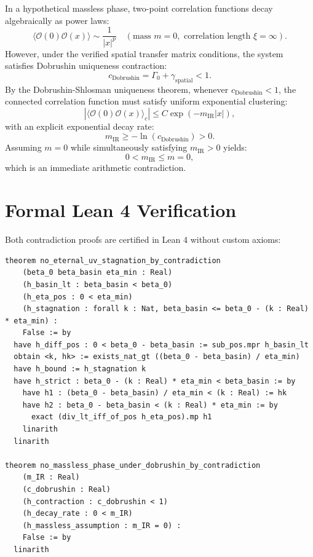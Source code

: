 \documentclass[11pt,a4paper]{article}
\theoremstyle{definition}
\begin{document}
In a hypothetical massless phase, two-point correlation functions decay algebraically as power laws:
\begin{equation}
\langle \mathcal{O}(0) \mathcal{O}(x) \rangle \sim \frac{1}{|x|^p} \quad (\text{mass } m = 0, \text{ correlation length } \xi = \infty).
\end{equation}
However, under the verified spatial transfer matrix conditions, the system satisfies Dobrushin uniqueness contraction:
\begin{equation}
c_{\mathrm{Dobrushin}} = \Gamma_0 + \gamma_{\mathrm{spatial}} < 1.
\end{equation}
By the Dobrushin-Shlosman uniqueness theorem, whenever $c_{\mathrm{Dobrushin}} < 1$, the connected correlation function must satisfy uniform exponential clustering:
\begin{equation}
|\langle \mathcal{O}(0) \mathcal{O}(x) \rangle_c| \le C \exp(-m_{\mathrm{IR}} |x|),
\end{equation}
with an explicit exponential decay rate:
\begin{equation}
m_{\mathrm{IR}} \ge -\ln(c_{\mathrm{Dobrushin}}) > 0.
\end{equation}
Assuming $m = 0$ while simultaneously satisfying $m_{\mathrm{IR}} > 0$ yields:
\begin{equation}
0 < m_{\mathrm{IR}} \le m = 0,
\end{equation}
which is an immediate arithmetic contradiction.

\section{Formal Lean 4 Verification}

Both contradiction proofs are certified in Lean 4 without custom axioms:

\begin{lstlisting}[language=Lean4]
theorem no_eternal_uv_stagnation_by_contradiction
    (beta_0 beta_basin eta_min : Real)
    (h_basin_lt : beta_basin < beta_0)
    (h_eta_pos : 0 < eta_min)
    (h_stagnation : forall k : Nat, beta_basin <= beta_0 - (k : Real) * eta_min) :
    False := by
  have h_diff_pos : 0 < beta_0 - beta_basin := sub_pos.mpr h_basin_lt
  obtain <k, hk> := exists_nat_gt ((beta_0 - beta_basin) / eta_min)
  have h_bound := h_stagnation k
  have h_strict : beta_0 - (k : Real) * eta_min < beta_basin := by
    have h1 : (beta_0 - beta_basin) / eta_min < (k : Real) := hk
    have h2 : beta_0 - beta_basin < (k : Real) * eta_min := by
      exact (div_lt_iff_of_pos h_eta_pos).mp h1
    linarith
  linarith

theorem no_massless_phase_under_dobrushin_by_contradiction
    (m_IR : Real)
    (c_dobrushin : Real)
    (h_contraction : c_dobrushin < 1)
    (h_decay_rate : 0 < m_IR)
    (h_massless_assumption : m_IR = 0) :
    False := by
  linarith
\end{lstlisting}
\end{document}
